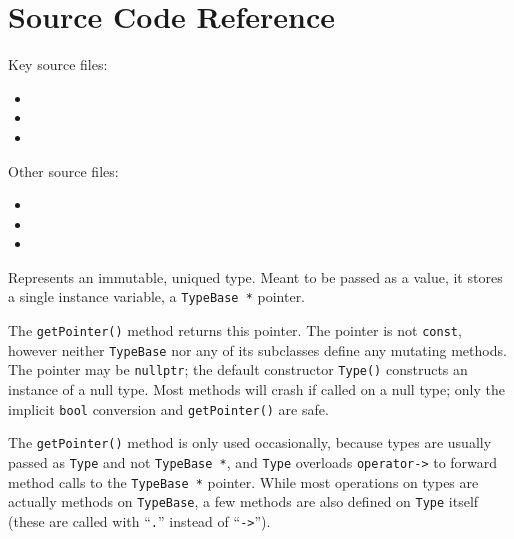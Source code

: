 \documentclass[../generics]{subfiles}
\begin{document}
\section{Source Code Reference}\label{typesourceref}

Key source files:
\begin{itemize}
\item {}
\item {}
\item {}
\end{itemize}
Other source files:
\begin{itemize}
\item {}
\item {}
\item {}
\end{itemize}

Represents an immutable, uniqued type. Meant to be passed as a value, it stores a single instance variable, a \texttt{TypeBase *} pointer.

The \texttt{getPointer()} method returns this pointer. The pointer is not \texttt{const}, however neither \texttt{TypeBase} nor any of its subclasses define any mutating methods. The pointer may be \texttt{nullptr}; the default constructor \texttt{Type()} constructs an instance of a null type. Most methods will crash if called on a null type; only the implicit \texttt{bool} conversion and \texttt{getPointer()} are safe.

The \texttt{getPointer()} method is only used occasionally, because types are usually passed as \texttt{Type} and not \texttt{TypeBase *}, and \texttt{Type} overloads \texttt{operator->} to forward method calls to the \texttt{TypeBase *} pointer. While most operations on types are actually methods on \texttt{TypeBase}, a few methods are also defined on \texttt{Type} itself (these are called with ``\texttt{.}'' instead of ``\texttt{->}'').
\end{document}
